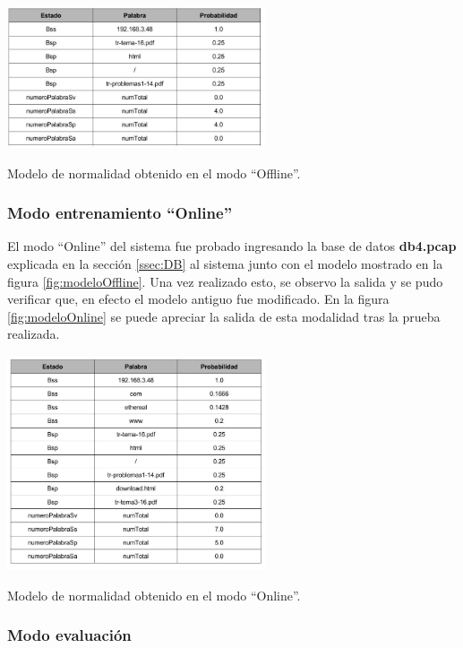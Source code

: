 \begin{table}[!htb]
\begin{center}
\includegraphics[width=3in]{./img/modeloOffline.jpg}
\caption{Modelo de normalidad obtenido en el modo ``Offline''.}
\label{fig:modeloOffline}
\end{center}
\end{table}

\subsubsection{Modo entrenamiento ``Online''}

El modo ``Online'' del sistema fue probado ingresando la base de datos \textbf{db4.pcap} explicada en la sección \ref{ssec:DB} al sistema junto con el modelo mostrado en la figura \ref{fig:modeloOffline}. Una vez realizado esto, se observo la salida y se pudo verificar que, en efecto el modelo antiguo fue modificado. En la figura \ref{fig:modeloOnline} se puede apreciar la salida de esta modalidad tras la prueba realizada.

\begin{table}[!htb]
\begin{center}
\includegraphics[width=3in]{./img/modeloOnline.jpg}
\caption{Modelo de normalidad obtenido en el modo ``Online''.}
\label{fig:modeloOnline}
\end{center}
\end{table}

\subsubsection{Modo evaluación}


